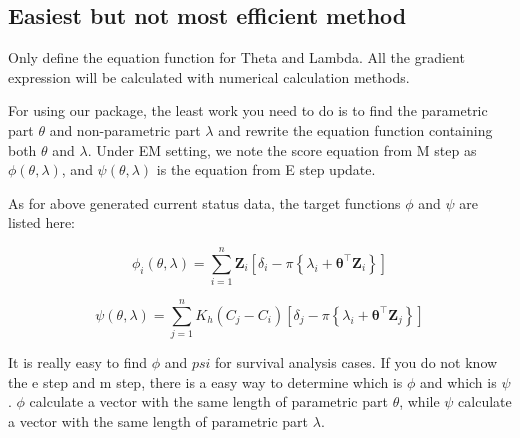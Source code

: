 \documentclass[
]{article}
\newenvironment{Shaded}{\begin{snugshade}}{\end{snugshade}}
\newcommand{\AttributeTok}[1]{\textcolor[rgb]{0.77,0.63,0.00}{#1}}
\newcommand{\CommentTok}[1]{\textcolor[rgb]{0.56,0.35,0.01}{\textit{#1}}}
\newcommand{\FloatTok}[1]{\textcolor[rgb]{0.00,0.00,0.81}{#1}}
\newcommand{\FunctionTok}[1]{\textcolor[rgb]{0.00,0.00,0.00}{#1}}
\newcommand{\NormalTok}[1]{#1}
\newcommand{\OtherTok}[1]{\textcolor[rgb]{0.56,0.35,0.01}{#1}}
\newcommand{\SpecialCharTok}[1]{\textcolor[rgb]{0.00,0.00,0.00}{#1}}
\begin{document}
\begin{Shaded}
\end{Shaded}

\hypertarget{easiest-but-not-most-efficient-method}{%
\subsection{Easiest but not most efficient
method}\label{easiest-but-not-most-efficient-method}}

Only define the equation function for Theta and Lambda. All the gradient
expression will be calculated with numerical calculation methods.

For using our package, the least work you need to do is to find the
parametric part \(\theta\) and non-parametric part \(\lambda\) and
rewrite the equation function containing both \(\theta\) and
\(\lambda\). Under EM setting, we note the score equation from M step as
\(\phi(\theta,\lambda)\), and \(\psi(\theta,\lambda)\) is the equation
from E step update.

As for above generated current status data, the target functions
\(\phi\) and \(\psi\) are listed here:

\[\phi_i(\theta,\lambda)= \sum_{i=1}^{n} \mathbf{Z}_{i}\left[\delta_{i}-\pi\left\{\lambda_i+\boldsymbol{\theta}^{\top} \mathbf{Z}_{i}\right\}\right]\]

\[\psi(\theta,\lambda)=\sum_{j=1}^{n} K_{h}\left(C_{j}-C_{i}\right)\left[\delta_{j}-\pi\left\{\lambda_i+\boldsymbol{\theta}^{\top} \mathbf{Z}_{j}\right\}\right]\]

It is really easy to find \(\phi\) and \(psi\) for survival analysis
cases. If you do not know the e step and m step, there is a easy way to
determine which is \(\phi\) and which is \(\psi\). \(\phi\) calculate a
vector with the same length of parametric part \(\theta\), while
\(\psi\) calculate a vector with the same length of parametric part
\(\lambda\).
\end{document}
